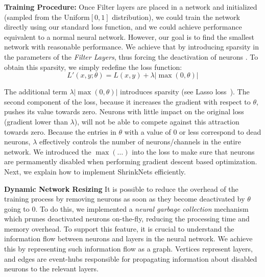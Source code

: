 \documentclass[sigconf]{acmart}
\newcommand{\gl}[1]{\textcolor{violet}{{\bf Gl:} #1}}
\begin{document}
\textbf{Training Procedure: } Once Filter layers are placed in a network and initialized (sampled from the Uniform$[0, 1]$ distribution),
we could train the network directly using our standard loss function, and we could achieve performance equivalent to a normal neural
network. However, our goal is to find the smallest network with reasonable
performance. We achieve that by introducing sparsity in the parameters of the
\textit{Filter Layers}, thus forcing the deactivation of neurons%
. To obtain this sparsity, we simply redefine the loss function:
\vspace{-.5em}
\begin{equation}
  L'(x,y;\theta) = L(x, y) + \lambda|\max(0, \theta)|
\end{equation}

The additional term $\lambda|\max(0, \theta)|$ introduces sparsity (see Lasso
loss~\cite{Tibshirani1996}). 
The second component of the loss, because it increases the gradient with
respect to $\theta$, pushes its value towards zero. Neurons with little impact
on the original loss (gradient lower than $\lambda$), will not be able to
compete against this attraction towards zero. Because the entries in $\theta$
with a value of $0$ or less correspond to dead neurons, $\lambda$ effectively
controls the number of neurons/channels in the entire network. We introduced
the $\max(\dots)$ into the loss to make sure that neurons are permamently disabled
when performing gradient descent based optimization. Next, we
explain how to implement ShrinkNets efficiently.

\textbf{Dynamic Network Resizing}
It is possible to reduce the overhead of the training process by removing
neurons as soon as they become deactivated by $\theta$ going to 0.
To do this, we implemented a \emph{neural garbage collection} mechanism which
prunes deactivated neurons on-the-fly,  reducing the processing time
and memory overhead. To support this feature, it is crucial to understand the
information flow between neurons and layers in the neural network. We achieve
this by representing such information flow as a graph. Vertices represent layers,
and edges are event-hubs responsible for propagating information about disabled
neurons to the relevant layers.
\end{document}
